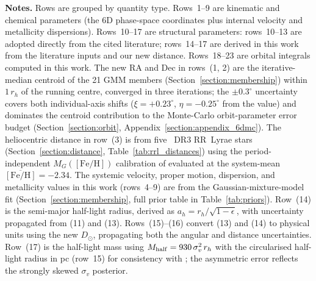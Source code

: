 \begin{table}[ht]
\vspace{1ex}
\noindent\parbox{\textwidth}{\footnotesize \textbf{Notes.} Rows are grouped by quantity type. Rows~1--9 are kinematic and chemical parameters (the 6D phase-space coordinates plus internal velocity and metallicity dispersions). Rows~10--17 are structural parameters: rows~10--13 are adopted directly from the cited literature; rows~14--17 are derived in this work from the literature inputs and our new distance. Rows~18--23 are orbital integrals computed in this work. The new RA and Dec in rows~(1, 2) are the iterative-median centroid of the 21 GMM members (Section~\ref{section:membership}) within $1\,r_h$ of the running centre, converged in three iterations; the $\pm 0.3^\circ$ uncertainty covers both individual-axis shifts ($\xi = +0.23^\circ$, $\eta = -0.25^\circ$ from the \citet{Grillmair2009} value) and dominates the centroid contribution to the Monte-Carlo orbit-parameter error budget (Section~\ref{section:orbit}, Appendix~\ref{section:appendix_6dmc}). The heliocentric distance in row~(3) is from five \gaia~DR3 RR~Lyrae stars (Section~\ref{section:distance}, Table~\ref{tab:rrl_distances}) using the period-independent $M_G([\mathrm{Fe/H}])$ calibration of \citet{Garofalo2022} evaluated at the system-mean $\overline{[\mathrm{Fe/H}]} = -2.34$. The systemic velocity, proper motion, dispersion, and metallicity values in this work (rows~4--9) are from the Gaussian-mixture-model fit (Section~\ref{section:membership}, full prior table in Table~\ref{tab:priors}). Row~(14) is the semi-major half-light radius, derived as $a_h = r_h/\sqrt{1-\epsilon}$, with uncertainty propagated from (11) and (13). Rows~(15)--(16) convert (13) and (14) to physical units using the new $D_\odot$, propagating both the angular and distance uncertainties. Row~(17) is the half-light mass using $M_{\rm half} = 930\,\sigma_v^2\,r_h$ \citep{Wolf2010} with the circularised half-light radius in pc (row~15) for consistency with \citet{Pace2022}; the asymmetric error reflects the strongly skewed $\sigma_v$ posterior.}
\end{table}
